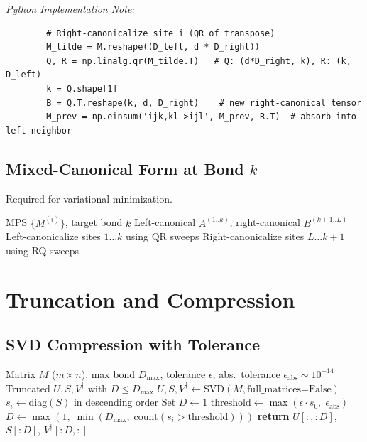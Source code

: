 \documentclass[aps,prb,onecolumn,scriptaddress]{revtex4-2}
\newcommand{\eps}{\epsilon}
\begin{document}
	\textit{Python Implementation Note:}
	\begin{verbatim}
		# Right-canonicalize site i (QR of transpose)
		M_tilde = M.reshape((D_left, d * D_right))
		Q, R = np.linalg.qr(M_tilde.T)   # Q: (d*D_right, k), R: (k, D_left)
		k = Q.shape[1]
		B = Q.T.reshape(k, d, D_right)    # new right-canonical tensor
		M_prev = np.einsum('ijk,kl->ijl', M_prev, R.T)  # absorb into left neighbor
	\end{verbatim}
	
	\subsection{Mixed-Canonical Form at Bond $k$}
	Required for variational minimization.
	
	\begin{algorithm}[H]
		\caption{BringToBond}
		\begin{algorithmic}[1]
			\Require MPS $\{M^{(i)}\}$, target bond $k$
			\Ensure Left-canonical $A^{(1..k)}$, right-canonical $B^{(k+1..L)}$
			\State Left-canonicalize sites $1 \dots k$ using QR sweeps
			\State Right-canonicalize sites $L \dots k+1$ using RQ sweeps
		\end{algorithmic}
	\end{algorithm}
	
	\clearpage
	\section{Truncation and Compression}
	
	\subsection{SVD Compression with Tolerance}
	\begin{algorithm}[H]
		\caption{TruncateBond}
		\begin{algorithmic}[1]
			\Require Matrix $M$ ($m \times n$), max bond $D_{\max}$,
			tolerance $\eps$, abs.\ tolerance $\eps_{\text{abs}} \sim 10^{-14}$
			\Ensure Truncated $U, S, V^\dagger$ with $D \leq D_{\max}$
			\State $U, S, V^\dagger \gets \text{SVD}(M, \text{full\_matrices=False})$
			\State $s_i \gets \text{diag}(S)$ in descending order
			\If{$s_0 < \eps_{\text{abs}}$}
			\State Set $D \gets 1$
			\Else
			\State $\text{threshold} \gets \max(\eps \cdot s_0,\; \eps_{\text{abs}})$
			\State $D \gets \max(1,\;\min(D_{\max},\;\text{count}(s_i > \text{threshold})))$
			\EndIf
			\State \textbf{return} $U[:, :D]$, $S[:D]$, $V^\dagger[:D, :]$
		\end{algorithmic}
	\end{algorithm}
	
\end{document}
